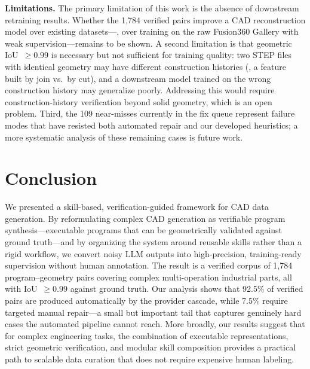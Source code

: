 \noindent\textbf{Limitations.}
The primary limitation of this work is the absence of downstream retraining results.
Whether the 1,784 verified pairs improve a CAD reconstruction model over existing
datasets---\eg, over training on the raw Fusion360 Gallery with weak supervision---remains
to be shown.
A second limitation is that geometric IoU~$\geq 0.99$ is necessary but not sufficient for
training quality: two STEP files with identical geometry may have different construction
histories (\eg, a feature built by join vs.\ by cut), and a downstream model trained on
the wrong construction history may generalize poorly.
Addressing this would require construction-history verification beyond solid geometry,
which is an open problem.
Third, the 109 near-misses currently in the fix queue represent failure modes that have
resisted both automated repair and our developed heuristics; a more systematic analysis of
these remaining cases is future work.

\section{Conclusion}
\label{sec:conclusion}

We presented a skill-based, verification-guided framework for CAD data generation.
By reformulating complex CAD generation as verifiable program synthesis---executable
programs that can be geometrically validated against ground truth---and by organizing the
system around reusable skills rather than a rigid workflow, we convert noisy LLM outputs
into high-precision, training-ready supervision without human annotation.
The result is a verified corpus of 1,784 program--geometry pairs covering complex
multi-operation industrial parts, all with IoU~$\geq 0.99$ against ground truth.
Our analysis shows that 92.5\% of verified pairs are produced automatically by the
provider cascade, while 7.5\% require targeted manual repair---a small but important tail
that captures genuinely hard cases the automated pipeline cannot reach.
More broadly, our results suggest that for complex engineering tasks, the combination of
executable representations, strict geometric verification, and modular skill composition
provides a practical path to scalable data curation that does not require expensive human
labeling.
